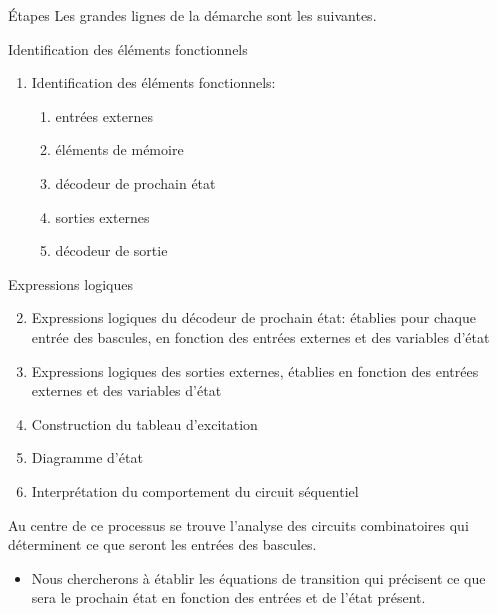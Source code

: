 \documentclass[presentation]{beamer}
\begin{document}
\begin{frame}[label={sec:orge69140c}]{Étapes}
Les grandes lignes de la démarche sont les suivantes.
\end{frame}

\begin{frame}[label={sec:org70d0102}]{Identification des éléments fonctionnels}
\begin{enumerate}
\item Identification des éléments fonctionnels:

\begin{enumerate}
\item entrées externes

\item éléments de mémoire

\item décodeur de prochain état

\item sorties externes

\item décodeur de sortie
\end{enumerate}
\end{enumerate}
\end{frame}

\begin{frame}[label={sec:org2832eb2}]{Expressions logiques}
\begin{enumerate}
\setcounter{enumi}{1}
\item Expressions logiques du décodeur de prochain état: établies pour
chaque entrée des bascules, en fonction des entrées externes et des
variables d'état

\item Expressions logiques des sorties externes, établies en fonction des
entrées externes et des variables d'état

\setcounter{enumi}{3}
\item Construction du tableau d'excitation

\setcounter{enumi}{4}
\item Diagramme d'état

\item Interprétation du comportement du circuit séquentiel
\end{enumerate}

Au centre de ce processus se trouve l'analyse des circuits combinatoires qui déterminent ce que seront les entrées des bascules.

\begin{itemize}
\item Nous chercherons à établir les \alert{équations de transition} qui précisent ce que sera le prochain état en fonction des entrées et de l'état présent.
\end{itemize}
\end{frame}
\end{document}
